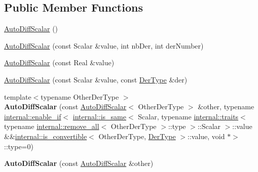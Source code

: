 \subsection*{Public Member Functions}
\begin{DoxyCompactItemize}
\item 
\hyperlink{class_eigen_1_1_auto_diff_scalar_ae73d362745e986c00cee5658bf731412}{Auto\+Diff\+Scalar} ()
\item 
\hyperlink{class_eigen_1_1_auto_diff_scalar_a7f4f44f682ba5d500c34c4f2fa6ecb9e}{Auto\+Diff\+Scalar} (const Scalar \&value, int nb\+Der, int der\+Number)
\item 
\hyperlink{class_eigen_1_1_auto_diff_scalar_a14e0f5ecc595deb05aaf336f5a81b861}{Auto\+Diff\+Scalar} (const Real \&value)
\item 
\hyperlink{class_eigen_1_1_auto_diff_scalar_a09641114cbb3b98a1132b82dff5939e3}{Auto\+Diff\+Scalar} (const Scalar \&value, const \hyperlink{group___sparse_core___module}{Der\+Type} \&der)
\item 
\mbox{\label{class_eigen_1_1_auto_diff_scalar_a3e5a45db10ac5cfb688da1f64e72839d}} 
{\footnotesize template$<$typename Other\+Der\+Type $>$ }\\{\bfseries Auto\+Diff\+Scalar} (const \hyperlink{class_eigen_1_1_auto_diff_scalar}{Auto\+Diff\+Scalar}$<$ Other\+Der\+Type $>$ \&other, typename \hyperlink{struct_eigen_1_1internal_1_1enable__if}{internal\+::enable\+\_\+if}$<$ \hyperlink{struct_eigen_1_1internal_1_1is__same}{internal\+::is\+\_\+same}$<$ Scalar, typename \hyperlink{struct_eigen_1_1internal_1_1traits}{internal\+::traits}$<$ typename \hyperlink{struct_eigen_1_1internal_1_1remove__all}{internal\+::remove\+\_\+all}$<$ Other\+Der\+Type $>$\+::type $>$\+::Scalar $>$\+::value \&\&\hyperlink{struct_eigen_1_1internal_1_1is__convertible}{internal\+::is\+\_\+convertible}$<$ Other\+Der\+Type, \hyperlink{group___sparse_core___module}{Der\+Type} $>$\+::value, void $\ast$$>$\+::type=0)
\item 
\mbox{\label{class_eigen_1_1_auto_diff_scalar_ae400a7ea2732a0157671b29a7be2f6d3}} 
{\bfseries Auto\+Diff\+Scalar} (const \hyperlink{class_eigen_1_1_auto_diff_scalar}{Auto\+Diff\+Scalar} \&other)
\item 
\mbox{\label{class_eigen_1_1_auto_diff_scalar_ace0b339ca93dbf2097e69b1d3996f2cd}} 
$$
\end{DoxyCompactItemize}
